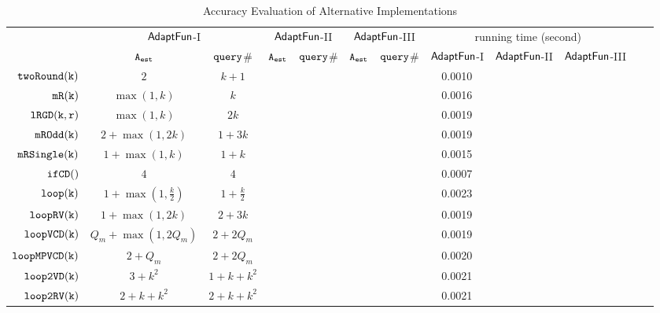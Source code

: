{\footnotesize
\begin {table}[H]
\vspace{-0.2cm}
    \caption{Accuracy Evaluation of {\THESYSTEM}  Alternative Implementations}
    \vspace{-0.2cm}
        \label{tb:adapt-imp-alternatives}
        \begin{center}
        \centering
{\tiny
        \begin{tabular}{ | >{\tiny}r | c | c | c | c | c | c | c | c | c | c | c |}
        \hline \hline
        \multirow{2}{*}{Program $c$}
         & \multicolumn{2}{c|}{$\textsf{AdaptFun}$-I}
         & \multicolumn{2}{c|}{$\textsf{AdaptFun}$-II}
         & \multicolumn{2}{c|}{$\textsf{AdaptFun}$-III}
         & \multicolumn{3}{c|}{running time (second)} \\ 
         \cline{2-8}
         & {${\mathtt{A_{est}}}$ } & {${\tt query}$\# } & {${\mathtt{A_{est}}}$ } & {${\tt query}$\# } & {${\mathtt{A_{est}}}$ } & {${\tt query}$\# } & $\textsf{AdaptFun}$-I & $\textsf{AdaptFun}$-II & $\textsf{AdaptFun}$-III \\ 
         \cline{5-10}
         \hline \hline
         $  \mathtt{twoRound(k)}$ &  $2$    & $k+1 $  & & & & & 0.0010 &  &  \\
         $  \mathtt{mR(k)}$ &   $\max(1,k)$ & $k$  &  & & & & 0.0016 & & \\
         $  \mathtt{lRGD(k, r)}$ & $\max(1,k) $ & $ 2k $  &  & & & & 0.0019 & &  \\
         $  \mathtt{mROdd(k)}$  &  $2+\max(1,2k)  $ & $1 + 3 k  $  &  & & & & 0.0019 & &\\
         $  \mathtt{mRSingle(k)}$    & $1+ \max(1, k) $ & $1 + k$  &  & & & & 0.0015 & & \\
         $  \mathtt{ifCD()}$   & $4$ &   $4$  & & & & & 0.0007 & & \\
         $  \mathtt{loop(k)}$ &    $1 + \max(1, \frac{k}{2}) $  &  $1+\frac{k}{2} $ & & & & & 0.0023 &  & \\
         $  \mathtt{loopRV(k)}$   &  $ 1 + \max(1,2k)$ & $2 + 3 k$  &  & & & & 0.0019 & & \\
         $  {\mathtt{loopVCD(k)}} $  &  ${Q_m+\max(1,2Q_m)}$  & $2+2Q_m$   &  & & & & 0.0019 & \\
         $ {\mathtt{loopMPVCD(k)}}$  &  $2 + Q_m$  & $2+2Q_m$   &   & & & & 0.0020 & & \\
         $  \mathtt{loop2VD(k)}$  &   $3 + k^2$ & $1 + k + k^2$   &  & & & & 0.0021 & & \\
         $  \mathtt{loop2RV(k)}$  &  $ 2 + k +  k^2 $    &  $2 + k + k^2$   &  & & & & 0.0021 & & \\

\end{tabular}}
\end{center}
\end{table}}
